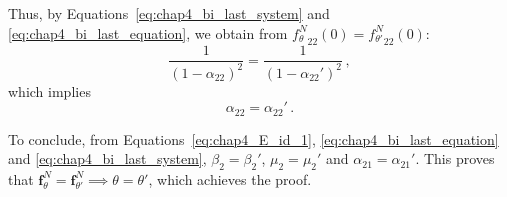 \begin{subappendices}
Thus, by Equations~\eqref{eq:chap4_bi_last_system} and \eqref{eq:chap4_bi_last_equation}, we obtain from ${f_\theta^N}_{22}(0) = {f_{\theta'}^N}_{22}(0)$:
\[
\frac{1}{(1-\alpha_{22})^2} = \frac{1}{(1-\alpha_{22}')^2} \,,
\]
which implies
\[
\alpha_{22} = \alpha_{22}' \,.
\]

To conclude, from Equations~\eqref{eq:chap4_E_id_1}, \eqref{eq:chap4_bi_last_equation} and \eqref{eq:chap4_bi_last_system},
$\beta_2 = \beta_2'$, $\mu_2 = \mu_2'$ and $\alpha_{21} = \alpha_{21}'$.
This proves that $\mathbf{f}_\theta^N = \mathbf{f}_{\theta'}^N \implies \theta = \theta'$, which achieves the proof.

\end{subappendices}